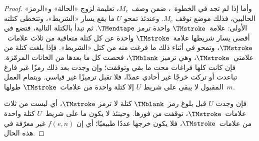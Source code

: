 \documentclass[../../../include/open-logic-section]{subfiles}
\begin{document}
\begin{proof}
  وأما إذا لم تجد في الخطوة~، ضمن وصف~$M_e$،
  تعليمة لزوج «الحالة» و«الرمز» الحاليين، فذلك موضع توقف $M_e$.
  وعندئذ تمحو $U$ ما يقع يسار «الشريط»، وتتخطى كتلته الأولى:
  علامة~$\TMstroke$ واحدة ترمز $\TMendtape$. ثم تبدأ بالكتلة
  التالية، فتضع في أقصى يسار شريطها علامة~$\TMstroke$ واحدة
  عن كل كتلة متعاقبة من ثلاث علامات~$\TMstroke$، وتمحو في أثناء
  ذلك ما فرغت منه من كتل «الشريط». فإذا بلغت كتلة من
  علامتي~$\TMstroke$، وهي ترميز $\TMblank$، فحصت كل ما بعدها من
  الخانات المرمّزة. فإن كانت كلها فراغات محت ما بقي وتوقفت؛ وإن
  وجدت بعد ذلك رمزًا غير فارغ تباعدت أو تركت خرجًا غير أحادي عمدًا،
  فلا تقبل ترميزًا غير قياسي. وبتمام العمل المقبول لا يبقى على شريط
  $U$ إلا كتلة واحدة من علامات~$\TMstroke$ طولها~$m$.


  فإن وجدت $U$ قبل بلوغ رمز~$\TMblank$ كتلة لا ترمز
  $\TMstroke$، أي ليست من ثلاث علامات~$\TMstroke$، توقفت من
  فورها. وحينئذ لا يكون ما على شريط~$U$ كتلة واحدة من
  علامات~$\TMstroke$، فلا يكون خرجها عددًا طبيعيًا؛ أي إن
  $f(e,n)$ غير معرّفة في هذه الحال.
\end{proof}
\end{document}
